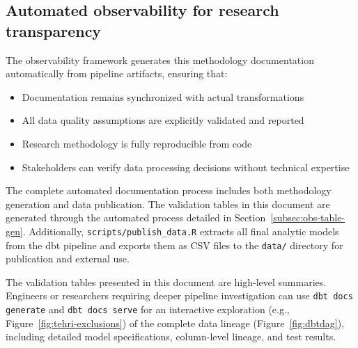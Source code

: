 \documentclass{article}
\begin{document}
\subsection{Automated observability for research transparency}

The observability framework generates this methodology documentation automatically from pipeline artifacts, ensuring that:
\begin{itemize}
    \item Documentation remains synchronized with actual transformations
    \item All data quality assumptions are explicitly validated and reported
    \item Research methodology is fully reproducible from code
    \item Stakeholders can verify data processing decisions without technical expertise
\end{itemize}

The complete automated documentation process includes both methodology generation and data publication. The validation tables in this document are generated through the automated process detailed in Section~\ref{subsec:obs-table-gen}. Additionally, \texttt{scripts/publish\_data.R} extracts all final analytic models from the dbt pipeline and exports them as CSV files to the \texttt{data/} directory for publication and external use.

The validation tables presented in this document are high-level summaries. Engineers or researchers requiring deeper pipeline investigation can use \texttt{dbt docs generate} and \texttt{dbt docs serve} for an interactive exploration (e.g., Figure~\ref{fig:tehri-exclusions}) of the complete data lineage (Figure~\ref{fig:dbtdag}), including detailed model specifications, column-level lineage, and test results. 
\end{document}
